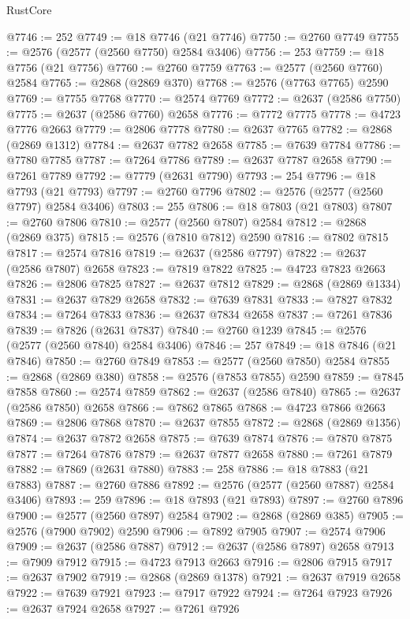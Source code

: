 \begin{lexlean}{RustCore}
\begin{coremodule}
@7746 := 252
@7749 := @18 @7746 (@21 @7746)
@7750 := @2760 @7749
@7755 := @2576 (@2577 (@2560 @7750) @2584 @3406)
@7756 := 253
@7759 := @18 @7756 (@21 @7756)
@7760 := @2760 @7759
@7763 := @2577 (@2560 @7760) @2584
@7765 := @2868 (@2869 @370)
@7768 := @2576 (@7763 @7765) @2590
@7769 := @7755 @7768
@7770 := @2574 @7769
@7772 := @2637 (@2586 @7750)
@7775 := @2637 (@2586 @7760) @2658
@7776 := @7772 @7775
@7778 := @4723 @7776 @2663
@7779 := @2806 @7778
@7780 := @2637 @7765
@7782 := @2868 (@2869 @1312)
@7784 := @2637 @7782 @2658
@7785 := @7639 @7784
@7786 := @7780 @7785
@7787 := @7264 @7786
@7789 := @2637 @7787 @2658
@7790 := @7261 @7789
@7792 := @7779 (@2631 @7790)
@7793 := 254
@7796 := @18 @7793 (@21 @7793)
@7797 := @2760 @7796
@7802 := @2576 (@2577 (@2560 @7797) @2584 @3406)
@7803 := 255
@7806 := @18 @7803 (@21 @7803)
@7807 := @2760 @7806
@7810 := @2577 (@2560 @7807) @2584
@7812 := @2868 (@2869 @375)
@7815 := @2576 (@7810 @7812) @2590
@7816 := @7802 @7815
@7817 := @2574 @7816
@7819 := @2637 (@2586 @7797)
@7822 := @2637 (@2586 @7807) @2658
@7823 := @7819 @7822
@7825 := @4723 @7823 @2663
@7826 := @2806 @7825
@7827 := @2637 @7812
@7829 := @2868 (@2869 @1334)
@7831 := @2637 @7829 @2658
@7832 := @7639 @7831
@7833 := @7827 @7832
@7834 := @7264 @7833
@7836 := @2637 @7834 @2658
@7837 := @7261 @7836
@7839 := @7826 (@2631 @7837)
@7840 := @2760 @1239
@7845 := @2576 (@2577 (@2560 @7840) @2584 @3406)
@7846 := 257
@7849 := @18 @7846 (@21 @7846)
@7850 := @2760 @7849
@7853 := @2577 (@2560 @7850) @2584
@7855 := @2868 (@2869 @380)
@7858 := @2576 (@7853 @7855) @2590
@7859 := @7845 @7858
@7860 := @2574 @7859
@7862 := @2637 (@2586 @7840)
@7865 := @2637 (@2586 @7850) @2658
@7866 := @7862 @7865
@7868 := @4723 @7866 @2663
@7869 := @2806 @7868
@7870 := @2637 @7855
@7872 := @2868 (@2869 @1356)
@7874 := @2637 @7872 @2658
@7875 := @7639 @7874
@7876 := @7870 @7875
@7877 := @7264 @7876
@7879 := @2637 @7877 @2658
@7880 := @7261 @7879
@7882 := @7869 (@2631 @7880)
@7883 := 258
@7886 := @18 @7883 (@21 @7883)
@7887 := @2760 @7886
@7892 := @2576 (@2577 (@2560 @7887) @2584 @3406)
@7893 := 259
@7896 := @18 @7893 (@21 @7893)
@7897 := @2760 @7896
@7900 := @2577 (@2560 @7897) @2584
@7902 := @2868 (@2869 @385)
@7905 := @2576 (@7900 @7902) @2590
@7906 := @7892 @7905
@7907 := @2574 @7906
@7909 := @2637 (@2586 @7887)
@7912 := @2637 (@2586 @7897) @2658
@7913 := @7909 @7912
@7915 := @4723 @7913 @2663
@7916 := @2806 @7915
@7917 := @2637 @7902
@7919 := @2868 (@2869 @1378)
@7921 := @2637 @7919 @2658
@7922 := @7639 @7921
@7923 := @7917 @7922
@7924 := @7264 @7923
@7926 := @2637 @7924 @2658
@7927 := @7261 @7926

\end{coremodule}
\end{lexlean}
